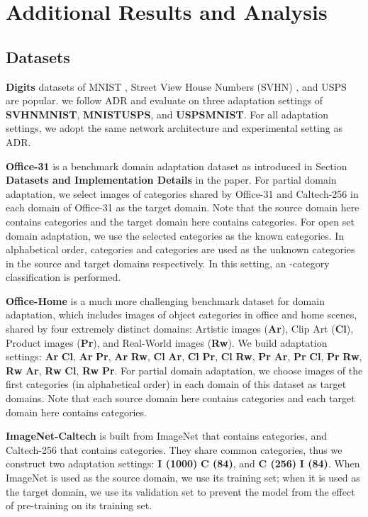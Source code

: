 \documentclass[letterpaper]{article} \usepackage{aaai20}  \usepackage{times}  \usepackage{helvet} \usepackage{courier}  \usepackage[hyphens]{url}  \usepackage{graphicx} \urlstyle{rm} \def\UrlFont{\rm}  \usepackage{graphicx}  \frenchspacing  \setlength{\pdfpagewidth}{8.5in}  \setlength{\pdfpageheight}{11in}
\begin{document}
\section{Additional Results and Analysis}
\label{sec4}
\subsection{Datasets}
\noindent\textbf{Digits} datasets of MNIST \cite{mnist}, Street View House Numbers (SVHN) \cite{svhn}, and USPS \cite{usps} are popular. we follow ADR \cite{adr} and evaluate on three adaptation settings of \textbf{SVHN}\textbf{MNIST}, \textbf{MNIST}\textbf{USPS}, and \textbf{USPS}\textbf{MNIST}. For all adaptation settings, we adopt the same network architecture and experimental setting as ADR.

\noindent\textbf{Office-31} \cite{office31} is a benchmark domain adaptation dataset as introduced in Section \textbf{Datasets and Implementation Details} in the paper. For partial domain adaptation, we select images of  categories shared by Office-31 and Caltech-256 \cite{caltech256} in each domain of Office-31 as the target domain. Note that the source domain here contains  categories and the target domain here contains  categories. For open set domain adaptation, we use the selected  categories as the known categories. In alphabetical order,  categories and  categories are used as the unknown categories in the source and target domains respectively. In this setting, an -category classification is performed. 

\noindent\textbf{Office-Home} \cite{office_home} is a much more challenging benchmark dataset for domain adaptation, which includes  images of  object categories in office and home scenes, shared by four extremely distinct domains: Artistic images (\textbf{Ar}), Clip Art (\textbf{Cl}), Product images (\textbf{Pr}), and Real-World images (\textbf{Rw}). We build  adaptation settings: \textbf{Ar}  \textbf{Cl}, \textbf{Ar}  \textbf{Pr}, \textbf{Ar}  \textbf{Rw}, \textbf{Cl}  \textbf{Ar}, \textbf{Cl}  \textbf{Pr}, \textbf{Cl}  \textbf{Rw}, \textbf{Pr}  \textbf{Ar}, \textbf{Pr}  \textbf{Cl}, \textbf{Pr}  \textbf{Rw}, \textbf{Rw}  \textbf{Ar}, \textbf{Rw}  \textbf{Cl}, \textbf{Rw}  \textbf{Pr}. For partial domain adaptation, we choose images of the first  categories (in alphabetical order) in each domain of this dataset as target domains. Note that each source domain here contains  categories and each target domain here contains  categories.

\noindent\textbf{ImageNet-Caltech} is built from ImageNet \cite{imagenet} that contains  categories, and Caltech-256 \cite{caltech256} that contains  categories. They share  common categories, thus we construct two adaptation settings: \textbf{I (1000)}  \textbf{C (84)}, and \textbf{C (256)}  \textbf{I (84)}. When ImageNet is used as the source domain, we use its training set; when it is used as the target domain, we use its validation set to prevent the model from the effect of pre-training on its training set. 
\end{document}
